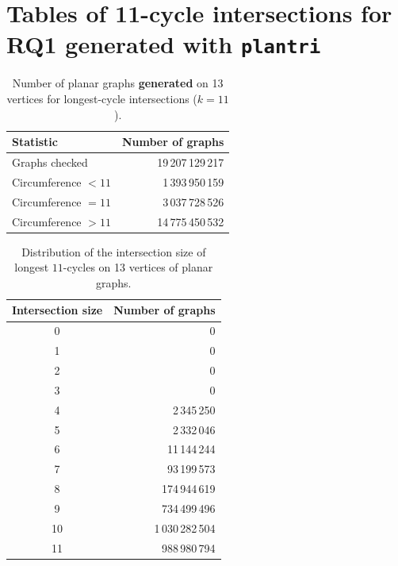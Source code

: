 \chapter{Tables of 11-cycle intersections for RQ1 generated with \texttt{plantri}}
\label{app:plantri}

\begin{table}[ht]
\centering
\caption{Number of planar graphs \textbf{generated} on 13 vertices for longest-cycle intersections ($k=11$).}
\label{tab:summary-planar-2con-n13}
\begin{tabular}{lr}
\toprule
Statistic & Number of graphs \\
\midrule
Graphs checked & 19\,207\,129\,217 \\
Circumference $<11$ & 1\,393\,950\,159 \\
Circumference $=11$ & 3\,037\,728\,526 \\
Circumference $>11$ & 14\,775\,450\,532 \\
\bottomrule
\end{tabular}
\end{table}

\begin{table}[ht]
\centering
\caption{Distribution of the intersection size of longest $11$-cycles on 13 vertices of planar graphs.}
\label{tab:intersection-d13d3-planar}
\begin{tabular}{cr}
\toprule
Intersection size & Number of graphs \\
\midrule
0 & 0 \\
1 & 0 \\
2 & 0 \\
3 & 0 \\
4 & 2\,345\,250 \\
5 & 2\,332\,046 \\
6 & 11\,144\,244 \\
7 & 93\,199\,573 \\
8 & 174\,944\,619 \\
9 & 734\,499\,496 \\
10 & 1\,030\,282\,504 \\
11 & 988\,980\,794 \\
\bottomrule
\end{tabular}
\end{table}